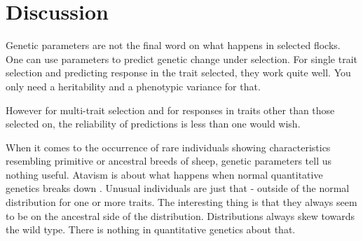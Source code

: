 \documentclass[titlepage]{article}  %
\begin{document}
\section{Discussion}
Genetic parameters are not the final word on what happens in selected flocks. One can use parameters to predict genetic change under selection. For single trait selection and predicting response in the trait selected, they work quite well. You only need a heritability and a phenotypic variance for that. 

However for multi-trait selection and for responses in traits other than those selected on, the reliability of predictions is less than one would wish. 

When it comes to the occurrence of rare individuals showing  characteristics resembling primitive or ancestral breeds of sheep, genetic parameters tell us nothing useful. Atavism is about what happens when normal quantitative genetics breaks down . Unusual individuals are just that - outside of the normal distribution for one or more traits. The interesting thing is that they always seem to be on the ancestral side of the distribution. Distributions always skew towards the wild type. There is nothing in quantitative genetics about that. 
\end{document}
